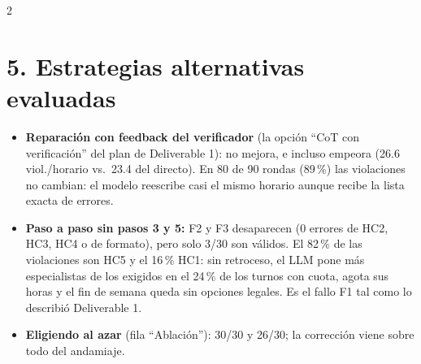 \documentclass[9pt,a4paper]{extarticle}
\begin{document}
\begin{multicols}{2}
\section{5. Estrategias alternativas evaluadas}
\begin{itemize}[label=$\blacktriangleright$]
    \item \textbf{Reparación con feedback del verificador} (la opción ``CoT con verificación'' del plan de Deliverable 1): no mejora, e incluso empeora (26.6 viol./horario vs.\ 23.4 del directo). En 80 de 90 rondas (89\,\%) las violaciones no cambian: el modelo reescribe casi el mismo horario aunque recibe la lista exacta de errores.
    \item \textbf{Paso a paso sin pasos 3 y 5:} F2 y F3 desaparecen (0 errores de HC2, HC3, HC4 o de formato), pero solo 3/30 son válidos. El 82\,\% de las violaciones son HC5 y el 16\,\% HC1: sin retroceso, el LLM pone más especialistas de los exigidos en el 24\,\% de los turnos con cuota, agota sus horas y el fin de semana queda sin opciones legales. Es el fallo F1 tal como lo describió Deliverable 1.
    \item \textbf{Eligiendo al azar} (fila ``Ablación''): 30/30 y 26/30; la corrección viene sobre todo del andamiaje.
\end{itemize}


\end{multicols}
\end{document}
